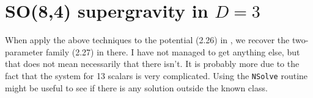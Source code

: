 \documentclass[11pt]{article}
\begin{document}
\section{SO(8,4) supergravity in $D=3$} \label{sec: 3dSugra}


When apply the above techniques to the potential (2.26) in \cite{Eloy:2021fhc}, we recover the two-parameter family (2.27) in there. I have not managed to get anything else, but that does not mean necessarily that there isn't. It is probably more due to the fact that the system for 13 scalars is very complicated. Using the \texttt{NSolve} routine might be useful to see if there is any solution outside the known class.


\end{document}
